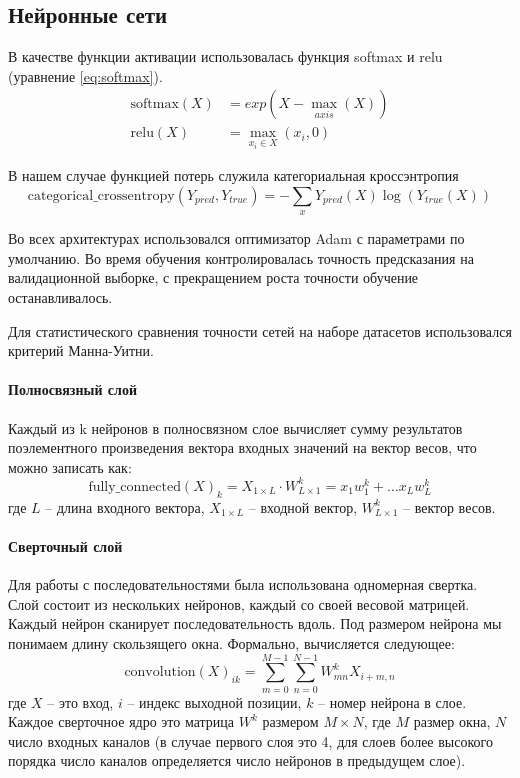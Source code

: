 \subsection{Нейронные сети}

В качестве функции активации использовалась функция softmax и relu (уравнение \ref{eq:softmax}).
\begin{align} \label{eq:softmax}
\text{softmax}(X) &= exp(X - \max_{axis}(X)) \\
\text{relu}(X) &= \max_{x_i \in X}(x_i, 0)
\end{align}


В нашем случае функцией потерь служила категориальная кроссэнтропия
\begin{equation} \label{eq:cross}
\text{categorical\_crossentropy}(Y_{pred}, Y_{true}) = -\sum_{x}{Y_{pred}(X)\log(Y_{true}(X))}
\end{equation}

Во всех архитектурах использовался оптимизатор  Adam \cite{kingma_adam:_2014} с параметрами по умолчанию. 
Во время обучения контролировалась точность предсказания на валидационной выборке, с прекращением роста точности обучение останавливалось.

Для статистического сравнения точности сетей на наборе датасетов использовался критерий Манна-Уитни.

\paragraph{Полносвязный слой}
Каждый из k нейронов в полносвязном слое вычисляет сумму результатов поэлементного произведения вектора входных значений на вектор весов, что можно записать как:
\begin{equation}
	\text{fully_connected}(X)_{k} = X_{1\times L} \cdot W^k_{L\times 1} = x_1 w^k_1 +  \dots x_L w^k_L 
\end{equation}
где $L$ -- длина входного вектора, $X_{1\times L}$ -- входной вектор, $W^k_{L\times 1}$ -- вектор весов.

\paragraph{Сверточный слой}

Для работы с последовательностями была использована одномерная свертка. Слой состоит из нескольких нейронов, каждый со своей весовой матрицей. Каждый нейрон сканирует последовательность вдоль. Под размером нейрона мы понимаем длину скользящего окна. Формально, вычисляется следующее:
\begin{equation}
	\text{convolution}(X)_{ik} = \sum_{m=0}^{M-1}\sum_{n=0}^{N-1} W_{mn}^k X_{i+m, n}
\end{equation}
где $X$ -- это вход, $i$ -- индекс выходной позиции, $k$ -- номер нейрона в слое. Каждое сверточное ядро это матрица $W^k$ размером $M \times N$, где $M$ размер окна, $N$ число входных каналов (в случае первого слоя это 4, для слоев более высокого порядка число каналов определяется число нейронов в предыдущем слое).
